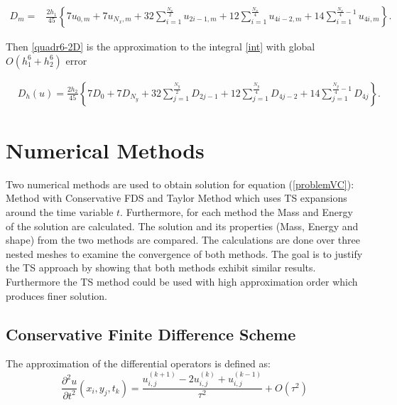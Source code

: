 \documentclass[%
 aip,
cp,  %
 amsmath,amssymb,%
 reprint,%
]{revtex4-2}
\newcommand{\be}{\begin{equation}}
\newcommand{\ee}{\end{equation}}
\newcommand{\rf}[1]{(\ref{#1})}
\begin{document}
\begin{align*}
D_m =& \frac{2h_1}{45} 
\left\{
7u_{0,m}+7u_{N_x,m}+32 \sum_{i=1}^{\frac{N_x}{2}}u_{2i-1,m}
+12\sum_{i=1}^{\frac{N_x}{4}}u_{4i-2,m}
+14 \sum_{i=1}^{\frac{N_x}{4}-1}u_{4i,m}
\right\}.
\end{align*}


Then \eqref{quadr6-2D} is the approximation to the integral \eqref{int} with global $O(h_1^6+h_2^6)$ error

\begin{align}\label{quadr6-2D}
&D_h(u) =
\frac{2h_2}{45} 
\left\{
7D_{0}+7D_{N_y}+32 \sum_{j=1}^{\frac{N_y}{2}}D_{2j-1}
+12\sum_{j=1}^{\frac{N_y}{4}}D_{4j-2}
+14 \sum_{j=1}^{\frac{N_y}{4}-1}D_{4j}
\right\}.
\end{align}

\section{Numerical Methods}

Two numerical methods are used to obtain solution for equation \rf{problemVC}: Method with Conservative FDS and Taylor Method which uses TS expansions around the time variable $t$. Furthermore, for each method the Mass and Energy of the solution are calculated. The solution and its properties (Mass, Energy and shape) from the two methods are compared. The calculations are done over three nested meshes to examine the convergence of both methods. The goal is to justify the TS approach by showing that both methods exhibit similar results. Furthermore the TS method could be used with high approximation order which produces finer solution.

\subsection{ Conservative Finite Difference Scheme }

The approximation of the differential operators is defined as:
\be\label{difft}
\frac{\partial^2 u}{\partial t^2}(x_i, y_j, t_k ) = \frac{ u^{(k+1)}_{i, j} - 2u^{(k)}_{i,j} + u^{(k-1)}_{i,j} }{\tau^2} + O(\tau^2) 
\ee
\end{document}
